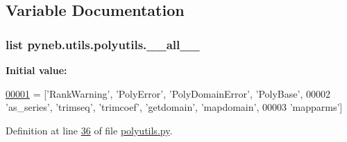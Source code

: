 \subsection{Variable Documentation}
\hypertarget{namespacepyneb_1_1utils_1_1polyutils_a5e54a45bb5c6fa4444f663a0b0da0e1f}{
\subsubsection[{\-\_\-\-\_\-all\-\_\-\-\_\-}]{\setlength{\rightskip}{0pt plus 5cm}list pyneb.\-utils.\-polyutils.\-\_\-\-\_\-all\-\_\-\-\_\-}}\label{namespacepyneb_1_1utils_1_1polyutils_a5e54a45bb5c6fa4444f663a0b0da0e1f}
{\bfseries Initial value\-:}
\begin{DoxyCode}
\hypertarget{namespacepyneb_1_1utils_1_1polyutils_l00001}{}\hyperlink{namespacepyneb_1_1utils_1_1polyutils}{00001} = [\textcolor{stringliteral}{'RankWarning'}, \textcolor{stringliteral}{'PolyError'}, \textcolor{stringliteral}{'PolyDomainError'}, \textcolor{stringliteral}{'PolyBase'},
00002            \textcolor{stringliteral}{'as\_series'}, \textcolor{stringliteral}{'trimseq'}, \textcolor{stringliteral}{'trimcoef'}, \textcolor{stringliteral}{'getdomain'}, \textcolor{stringliteral}{'mapdomain'},
00003            \textcolor{stringliteral}{'mapparms'}]
\end{DoxyCode}


Definition at line \hyperlink{polyutils_8py_source_l00036}{36} of file \hyperlink{polyutils_8py_source}{polyutils.\-py}.

